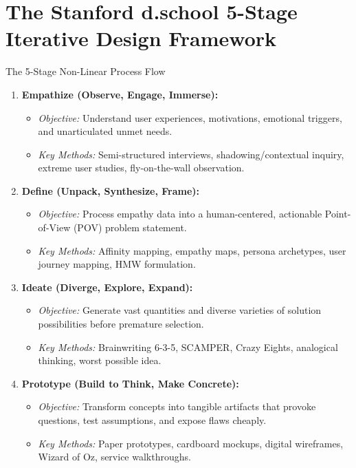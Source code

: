 \section{The Stanford d.school 5-Stage Iterative Design Framework}

\begin{frameworkbox}{The 5-Stage Non-Linear Process Flow}
\begin{enumerate}[label=\textbf{\arabic*.}, leftmargin=2em]
    \item \textbf{Empathize (Observe, Engage, Immerse):}
    \begin{itemize}
        \item \textit{Objective:} Understand user experiences, motivations, emotional triggers, and unarticulated unmet needs.
        \item \textit{Key Methods:} Semi-structured interviews, shadowing/contextual inquiry, extreme user studies, fly-on-the-wall observation.
    \end{itemize}
    \item \textbf{Define (Unpack, Synthesize, Frame):}
    \begin{itemize}
        \item \textit{Objective:} Process empathy data into a human-centered, actionable Point-of-View (POV) problem statement.
        \item \textit{Key Methods:} Affinity mapping, empathy maps, persona archetypes, user journey mapping, HMW formulation.
    \end{itemize}
    \item \textbf{Ideate (Diverge, Explore, Expand):}
    \begin{itemize}
        \item \textit{Objective:} Generate vast quantities and diverse varieties of solution possibilities before premature selection.
        \item \textit{Key Methods:} Brainwriting 6-3-5, SCAMPER, Crazy Eights, analogical thinking, worst possible idea.
    \end{itemize}
    \item \textbf{Prototype (Build to Think, Make Concrete):}
    \begin{itemize}
        \item \textit{Objective:} Transform concepts into tangible artifacts that provoke questions, test assumptions, and expose flaws cheaply.
        \item \textit{Key Methods:} Paper prototypes, cardboard mockups, digital wireframes, Wizard of Oz, service walkthroughs.

\end{itemize}
\end{enumerate}
\end{frameworkbox}
